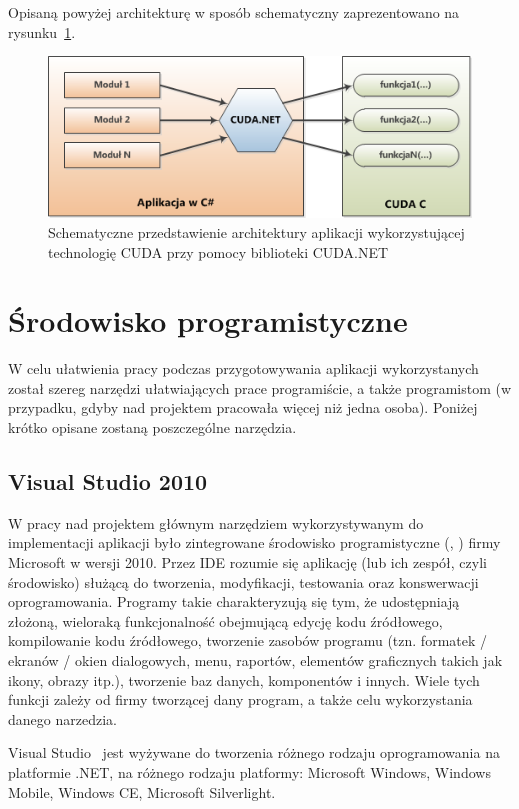 Opisaną powyżej architekturę w sposób schematyczny zaprezentowano na rysunku~\ref{rys:arch_cuda_net}.

\begin{figure}[ht]
\centering
\includegraphics{figures/04/arch_cuda_net.png}
\caption{Schematyczne przedstawienie architektury aplikacji wykorzystującej technologię CUDA przy pomocy biblioteki CUDA.NET}\label{rys:arch_cuda_net}
\end{figure}

\section{Środowisko programistyczne}
W celu ułatwienia pracy podczas przygotowywania aplikacji wykorzystanych został szereg narzędzi ułatwiających prace programiście, a także programistom (w przypadku, gdyby nad projektem pracowała więcej niż jedna osoba). Poniżej krótko opisane zostaną poszczególne narzędzia.

\subsection{Visual Studio 2010}
W pracy nad projektem głównym narzędziem wykorzystywanym do implementacji aplikacji było zintegrowane środowisko programistyczne (, ) firmy Microsoft w wersji 2010. Przez IDE rozumie się aplikację (lub ich zespół, czyli środowisko) służącą do tworzenia, modyfikacji, testowania oraz konswerwacji oprogramowania. Programy takie charakteryzują się tym, że udostępniają złożoną, wieloraką funkcjonalność obejmującą edycję kodu źródłowego, kompilowanie kodu źródłowego, tworzenie zasobów programu (tzn. formatek / ekranów / okien dialogowych, menu, raportów, elementów graficznych takich jak ikony, obrazy itp.), tworzenie baz danych, komponentów i innych. Wiele tych funkcji zależy od firmy tworzącej dany program, a także celu wykorzystania danego narzedzia.

Visual Studio~\cite{ms:visualStudio} jest wyżywane do tworzenia różnego rodzaju oprogramowania na platformie .NET, na różnego rodzaju platformy: Microsoft Windows, Windows Mobile, Windows CE, Microsoft Silverlight.

